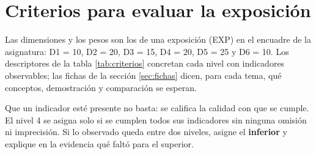 \documentclass[11pt,a4paper]{article}
\begin{document}
\section{Criterios para evaluar la exposición}\label{sec:criterios}

Las dimensiones y los pesos son los de una exposición (EXP) en el encuadre de la asignatura: D1 = 10, D2 = 20, D3 = 15, D4 = 20, D5 = 25 y D6 = 10. Los descriptores de la tabla \ref{tab:criterios} concretan cada nivel con indicadores observables; las fichas de la sección \ref{sec:fichas} dicen, para cada tema, qué conceptos, demostración y comparación se esperan.

\begin{avisoBox}[title={Regla para elegir el nivel}]
	Que un indicador esté presente no basta: se califica la calidad con que se cumple. El nivel 4 se asigna solo si se cumplen todos sus indicadores sin ninguna omisión ni imprecisión. Si lo observado queda entre dos niveles, asigne el \textbf{inferior} y explique en la evidencia qué faltó para el superior.
\end{avisoBox}
\end{document}
